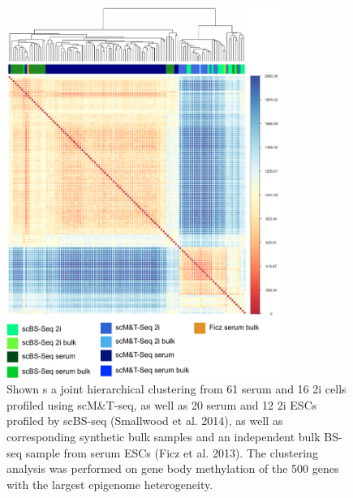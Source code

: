 \begin{figure}[htbp!]
\centering
\includegraphics[width=0.8\textwidth]{clust}
\caption[Hierarchical clustering of DNA-methylation profiles generated by scM\&T-seq and scBS-seq.]{Shown s a joint hierarchical clustering from 61 serum and 16 2i cells profiled using scM\&T-seq, as well as 20 serum and 12 2i ESCs profiled by scBS-seq (Smallwood et al. 2014), as well as corresponding synthetic bulk samples and an independent bulk BS-seq sample from serum ESCs (Ficz et al. 2013). The clustering analysis was performed on gene body methylation of the 500 genes with the largest epigenome heterogeneity.}
\label{fig:mt_clust}
\end{figure}

